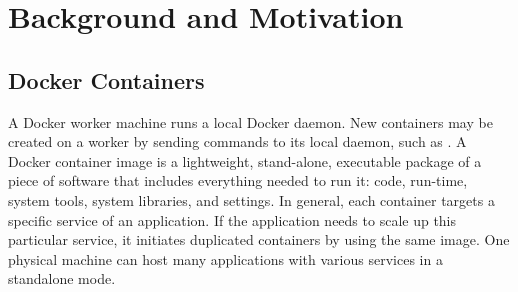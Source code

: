 \section{Background and Motivation}
\label{back}
\subsection{Docker Containers}

A Docker worker machine runs a local Docker daemon. 
New containers may be created on a worker by sending commands to its local daemon, such as . 
A Docker container image is a lightweight, stand-alone, executable package of a piece of software that 
includes everything needed to run it: code, run-time, system tools, system libraries, and settings.
In general, each container targets a specific service of an application. If the application needs to scale up this particular service, 
it initiates duplicated containers by using the same image. One physical machine can host many applications with various services in a standalone mode.

\begin{comment}
\begin{figure}[ht]
\centering
\texttt{[image: docker-standalone]}
\caption{Docker Containers}
\label{fig:docker-standalone} 
\end{figure}
\end{comment}

